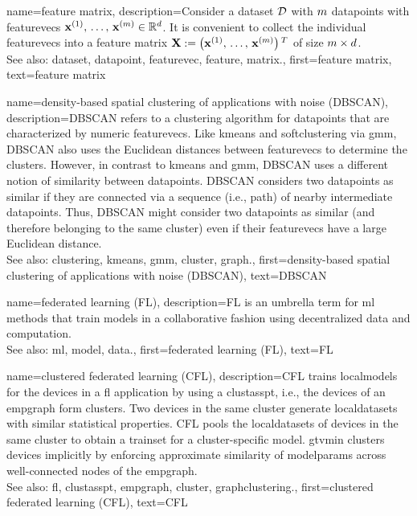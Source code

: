 {name={feature matrix}, 
	description={Consider a \gls{dataset} $\mathcal{D}$ 
		with $m$ \glspl{datapoint} with \glspl{featurevec} 
		${\bf x}^{(1)}, \,\ldots, \,{\bf x}^{(m)} \in \mathbb{R}^{d}$. 
		It is convenient to collect the individual \glspl{featurevec} into a \gls{feature} 
		\gls{matrix} ${\bf X} := \big({\bf x}^{(1)}, \,\ldots, \,{\bf x}^{(m)}\big)\,^{T}$ 
		of size $m \times d$.
				\\
		See also: \gls{dataset}, \gls{datapoint}, \gls{featurevec}, \gls{feature}, \gls{matrix}.},
	first={feature matrix},
	text={feature matrix} 
}

{name={density-based spatial clustering of applications with noise (DBSCAN)}, 
	description={DBSCAN 
		refers to a \gls{clustering} \gls{algorithm} for \glspl{datapoint} that are characterized by numeric \glspl{featurevec}. 
		Like \gls{kmeans} and \gls{softclustering} via \gls{gmm}, DBSCAN also uses the Euclidean 
		distances between \glspl{featurevec} to determine the \glspl{cluster}. However, in contrast to \gls{kmeans} 
		and \gls{gmm}, DBSCAN uses a different notion of similarity between \glspl{datapoint}. 
		DBSCAN considers two \glspl{datapoint} as similar if they are connected 
		via a sequence (i.e., path) of nearby intermediate \glspl{datapoint}. Thus, DBSCAN might consider 
		two \glspl{datapoint} as similar (and therefore belonging to the same cluster) even if 
		their \glspl{featurevec} have a large Euclidean distance.
				\\
		See also: \gls{clustering}, \gls{kmeans}, \gls{gmm}, \gls{cluster}, \gls{graph}.},
	first={density-based spatial clustering of applications with noise (DBSCAN)},
	text={DBSCAN} 
}

{name={federated learning (FL)}, 
	description={FL 
		is an umbrella term for \gls{ml} methods that train \glspl{model} in a collaborative 
		fashion using decentralized \gls{data} and computation.
				\\
		See also: \gls{ml}, \gls{model}, \gls{data}.},
	first={federated learning (FL)},
	text={FL} 
}
	
{name={clustered federated learning (CFL)}, 
	description={CFL trains \glspl{localmodel} for the 
 		\glspl{device} in a \gls{fl} application by using a \gls{clustasspt}, i.e., the \glspl{device} 
 		of an \gls{empgraph} form \glspl{cluster}. Two \glspl{device} in the same \gls{cluster} generate 
 		\glspl{localdataset} with similar statistical properties. CFL pools the \glspl{localdataset} of \glspl{device} 
 		in the same \gls{cluster} to obtain a \gls{trainset} for a \gls{cluster}-specific \gls{model}. 
 		\Gls{gtvmin} clusters \glspl{device} implicitly by enforcing approximate similarity of \gls{modelparams} 
 		across well-connected nodes of the \gls{empgraph}.\\ 
 		See also: \gls{fl}, \gls{clustasspt}, \gls{empgraph}, \gls{cluster}, \gls{graphclustering}.},
	first={clustered federated learning (CFL)},
	text={CFL} 
}

